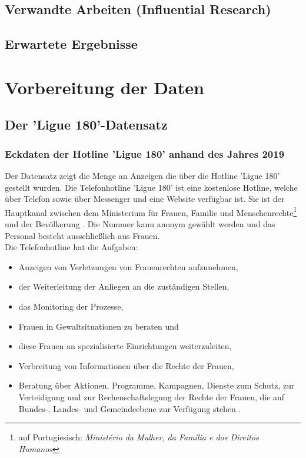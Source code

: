 \documentclass[12pt]{report}
\begin{document}
	\section{Verwandte Arbeiten (Influential Research)} 
	\section{Erwartete Ergebnisse}
	\chapter{Vorbereitung der Daten}
	\section{Der 'Ligue 180'-Datensatz}
	\subsection{Eckdaten der Hotline 'Ligue 180' anhand des Jahres 2019}
	Der Datensatz zeigt die Menge an Anzeigen die über die Hotline  'Ligue 180' gestellt wurden. 	Die Telefonhotline 'Ligue 180' ist eine kostenlose Hotline, welche über Telefon sowie über Messenger und eine Website verfügbar ist. Sie ist der Hauptkanal zwischen dem Ministerium für Frauen, Familie und Menschenrechte\footnote{auf Portugiesisch: \textit{Ministério da Mulher, da Família e dos Direitos Humanos}} und der Bevölkerung \cite[S. 12]{BalancoLigue180.2020}. Die Nummer kann anonym gewählt werden und das Personal besteht ausschließlich aus Frauen.\\
	Die Telefonhotline hat die Aufgaben:
	\begin{itemize}
		\item Anzeigen von Verletzungen von Frauenrechten aufzunehmen,
		\item der Weiterleitung der Anliegen an die zuständigen Stellen,
		\item das Monitoring der Prozesse,
		\item Frauen in Gewaltsituationen zu beraten und
		\item diese Frauen an spezialisierte Einrichtungen weiterzuleiten,
		\item Verbreitung von Informationen über die Rechte der Frauen,
		\item Beratung über Aktionen, Programme, Kampagnen, Dienste zum Schutz, zur Verteidigung und zur Rechenschaftslegung der Rechte der Frauen, die auf Bundes-, Landes- und Gemeindeebene zur Verfügung stehen \cite[S. 12, 19]{BalancoLigue180.2020}.
	\end{itemize} 
	
\end{document}

